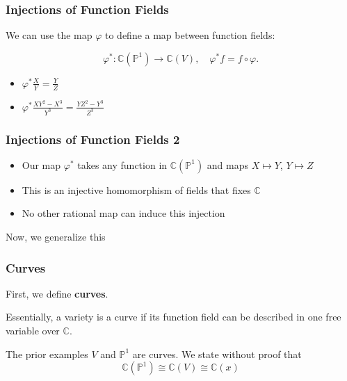\documentclass{beamer}
\theoremstyle{definition}
\begin{document}
\begin{frame}
    \frametitle{Injections of Function Fields}
    We can use the map \(\varphi\) to define a map between function fields:

   \[\varphi^\ast : \mathbb{C}(\mathbb{P}^1) \to \mathbb{C}(V), \quad \varphi^\ast f = f \circ \varphi.\]
   \begin{center}
\end{center}

\begin{itemize}
    \item[\textrightarrow] \(\varphi^\ast \frac{X}{Y} = \frac{Y}{Z}\)
    \item[\textrightarrow] \(\varphi^\ast \frac{XY^2 - X^3}{Y^3} = \frac{YZ^2 - Y^3}{Z^3}\)
\end{itemize}
\end{frame}
\begin{frame}
    \frametitle{Injections of Function Fields 2}
    \begin{itemize}
        \item Our map \(\varphi^\ast\) takes any function in \(\mathbb{C}(\mathbb{P}^1)\) and maps \(X\mapsto Y\), \(Y\mapsto Z\)
        \item This is an injective homomorphism of fields that fixes \(\mathbb{C}\)
        \item No other rational map can induce this injection
    \end{itemize}
        Now, we generalize this

    
    \end{frame}

    \begin{frame}
        \frametitle{Curves}
        First, we define \textbf{curves}.

        Essentially, a variety is a curve if its function field can be described in one free variable over \(\mathbb{C}\).

       The prior examples \(V\) and \(\mathbb{P}^1\) are curves. We state without proof that \[ \mathbb{C}(\mathbb{P}^1) \cong \mathbb{C}(V) \cong \mathbb{C}(x)\] 

    \end{frame}
\end{document}
